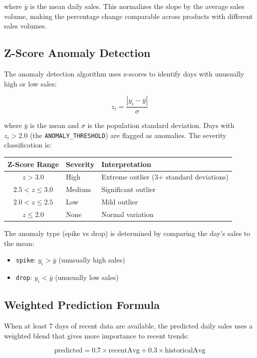 \documentclass[12pt,a4paper]{report}
\begin{document}
where $\bar{y}$ is the mean daily sales. This normalizes the slope by the average sales volume, making the percentage change comparable across products with different sales volumes.

\subsection{Z-Score Anomaly Detection}

The anomaly detection algorithm uses z-scores to identify days with unusually high or low sales:

\[
z_i = \frac{|y_i - \bar{y}|}{\sigma}
\]

where $\bar{y}$ is the mean and $\sigma$ is the population standard deviation. Days with $z_i > 2.0$ (the \texttt{ANOMALY\_THRESHOLD}) are flagged as anomalies. The severity classification is:

\begin{center}
\begin{tabular}{cll}
  \toprule
  \textbf{Z-Score Range} & \textbf{Severity} & \textbf{Interpretation} \\
  \midrule
  $z > 3.0$   & High   & Extreme outlier (3+ standard deviations) \\
  $2.5 < z \leq 3.0$ & Medium & Significant outlier \\
  $2.0 < z \leq 2.5$ & Low    & Mild outlier \\
  $z \leq 2.0$ & None  & Normal variation \\
  \bottomrule
\end{tabular}
\end{center}

The anomaly type (spike vs drop) is determined by comparing the day's sales to the mean:
\begin{itemize}[leftmargin=1.5em]
  \item \texttt{spike}: $y_i > \bar{y}$ (unusually high sales)
  \item \texttt{drop}: $y_i < \bar{y}$ (unusually low sales)
\end{itemize}

\subsection{Weighted Prediction Formula}

When at least 7 days of recent data are available, the predicted daily sales uses a weighted blend that gives more importance to recent trends:

\[
\text{predicted} = 0.7 \times \text{recentAvg} + 0.3 \times \text{historicalAvg}
\]
\end{document}
